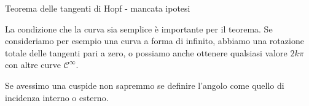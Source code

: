\documentclass[a4paper]{article}
\begin{document}
\begin{snippetexample}{Teorema delle tangenti di Hopf - mancata ipotesi}
    \begin{figure}
        \begin{center}
        \end{center}
    \end{figure}
    La condizione che la curva sia semplice è importante per il teorema.
    Se consideriamo per esempio una curva a forma di infinito,
    abbiamo una rotazione totale delle tangenti pari a zero,
    o possiamo anche ottenere qualsiasi valore \(2k\pi\) con altre curve \(\mathcal C^\infty\).
    \wrapfill
\end{snippetexample}

Se avessimo una cuspide non sapremmo se definire l'angolo come quello
di incidenza interno o esterno.
\end{document}
